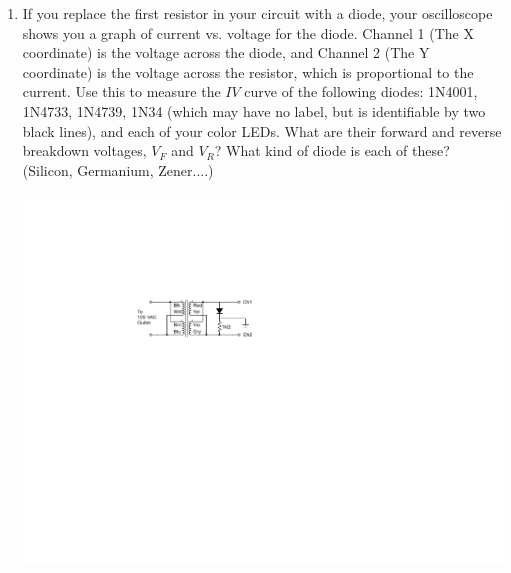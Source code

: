 \begin{enumerate}[wide]
\item If you replace the first resistor in your circuit with a diode, your oscilloscope shows you a graph of current vs. voltage for the diode.  Channel 1 (The X coordinate) is the voltage across the diode, and Channel 2 (The Y coordinate) is the voltage across the resistor, which is proportional to the current.  Use this to measure the $IV$ curve of the following diodes: 1N4001, 1N4733, 1N4739, 1N34 (which may have no label, but is identifiable by two black lines), and each of your color LEDs.  What are their forward and reverse breakdown voltages, $V_F$ and  $V_R$?  What kind of diode is each of these?  (Silicon, Germanium, Zener....) \label{part_measuring_diode_iv} \label{part_diode_measurements}
\vspace{-0.1in}
\begin{center}
\includegraphics{diodes/diode_testing_circuit_2.pdf}
\end{center}


\end{enumerate}
